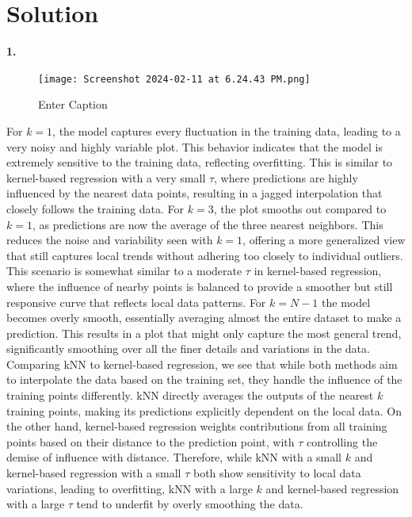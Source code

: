 \documentclass[submit]{harvardml}
\newenvironment{solution}
  {\color{blue}\section*{Solution}}
{}
\begin{document}
\begin{solution}

\bigskip
\textbf{1.}

\begin{figure}[h]
    \centering
    \texttt{[image: Screenshot 2024-02-11 at 6.24.43 PM.png]}
    \caption{Enter Caption}
    \label{fig:enter-label}
\end{figure}

For \(k=1\), the model captures every fluctuation in the training data, leading to a very noisy and highly variable plot. This behavior indicates that the model is extremely sensitive to the training data, reflecting overfitting. This is similar to kernel-based regression with a very small \(\tau\), where predictions are highly influenced by the nearest data points, resulting in a jagged interpolation that closely follows the training data. For \(k=3\), the plot smooths out compared to \(k=1\), as predictions are now the average of the three nearest neighbors. This reduces the noise and variability seen with \(k=1\), offering a more generalized view that still captures local trends without adhering too closely to individual outliers. This scenario is somewhat similar to a moderate \(\tau\) in kernel-based regression, where the influence of nearby points is balanced to provide a smoother but still responsive curve that reflects local data patterns. For \(k=N-1\) the model becomes overly smooth, essentially averaging almost the entire dataset to make a prediction. This results in a plot that might only capture the most general trend, significantly smoothing over all the finer details and variations in the data.\\

Comparing kNN to kernel-based regression, we see that while both methods aim to interpolate the data based on the training set, they handle the influence of the training points differently. kNN directly averages the outputs of the nearest \(k\) training points, making its predictions explicitly dependent on the local data. On the other hand, kernel-based regression weights contributions from all training points based on their distance to the prediction point, with \(\tau\) controlling the demise of influence with distance. Therefore, while kNN with a small \(k\) and kernel-based regression with a small \(\tau\) both show sensitivity to local data variations, leading to overfitting, kNN with a large \(k\) and kernel-based regression with a large \(\tau\) tend to underfit by overly smoothing the data.


\end{solution}
\end{document}
